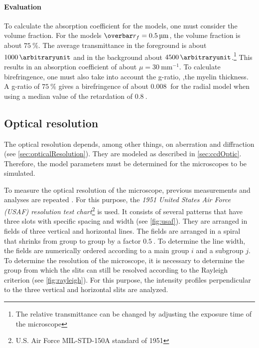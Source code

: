 \paragraph{Evaluation}
To calculate the absorption coefficient for the models, one must consider the volume fraction.
For the models $\fiberRadiusMean = \SI{0.5}{\micro\meter}$, the volume fraction is about $\SI{75}{\percent}$.
The average transmittance in the foreground is about $\SI{1000}{\arbitraryunit}$ and in the background about $\SI{4500}{\arbitraryunit}$.\footnote{The relative transmittance can be changed by adjusting the exposure time of the microscope}
This results in an absorption coefficient of about $\mu = \SI{30}{\milli\meter\tothe{-1}}$.
To calculate birefringence, one must also take into account the g-ratio, \ie{},the myelin thickness.
A g-ratio of $\SI{75}{\percent}$ gives a birefringence of about $\SI{0.008}{}$ for the radial model when using a median value of the retardation of $\SI{0.8}{}$.
%
% 
% 
\subsection{Optical resolution}
%
The optical resolution depends, among other things, on aberration and diffraction (see \cref{sec:opticalResolution}).
They are modeled as described in \cref{sec:ccdOptic}.
Therefore, the model parameters must be determined for the microscopes to be simulated.
\par
%
To measure the optical resolution of the microscope, previous measurements and analyses are repeated \cite{MenzelMaster}.
For this purpose, the \textit{1951 United States Air Force (USAF) resolution test chart}\footnote{U.S. Air Force MIL-STD-150A standard of 1951} is used.
It consists of several patterns that have three slots with specific spacing and width (see \cref{fig:usaf}).
They are arranged in fields of three vertical and horizontal lines.
The fields are arranged in a spiral that shrinks from group to group by a factor $\SI{0.5}{}$.
To determine the line width, the fields are numerically ordered according to a main group $i$ and a subgroup $j$.
To determine the resolution of the microscope, it is necessary to determine the group from which the slits can still be resolved according to the Rayleigh criterion (see \cref{fig:rayleigh}).
For this purpose, the intensity profiles perpendicular to the three vertical and horizontal slits are analyzed.
% 
